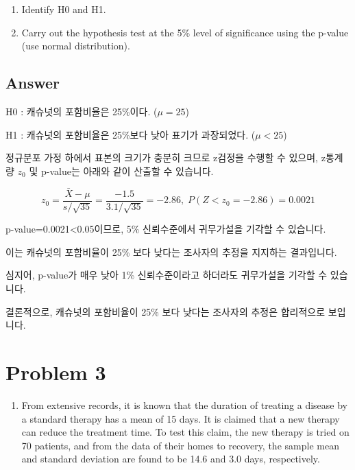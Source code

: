 \documentclass[
  a4paper,
  DIV=11,
  numbers=noendperiod]{scrreprt}
\providecommand{\tightlist}{%
  \setlength{\itemsep}{0pt}\setlength{\parskip}{0pt}}\usepackage{longtable,booktabs,array}
\begin{document}
\begin{enumerate}
\def\labelenumi{(\alph{enumi})}
\item
  Identify H0 and H1.
\item
  Carry out the hypothesis test at the 5\% level of significance using
  the p-value (use normal distribution).
\end{enumerate}

\subsection*{Answer}\label{answer-27}

H0 : 캐슈넛의 포함비율은 25\%이다. (\(\mu=25\))

H1 : 캐슈넛의 포함비율은 25\%보다 낮아 표기가 과장되었다. (\(\mu<25\))

정규분포 가정 하에서 표본의 크기가 충분히 크므로 z검정을 수행할 수
있으며, z통계량 \(z_0\) 및 p-value는 아래와 같이 산출할 수 있습니다.

\[z_0=\frac{\bar{X}-\mu}{s/\sqrt{35}}=\frac{-1.5}{3.1/\sqrt{35}}=-2.86,\;P(Z<z_0=-2.86)=0.0021\]

p-value=0.0021\textless0.05이므로, 5\% 신뢰수준에서 귀무가설을 기각할 수
있습니다.

이는 캐슈넛의 포함비율이 25\% 보다 낮다는 조사자의 추정을 지지하는
결과입니다.

심지어, p-value가 매우 낮아 1\% 신뢰수준이라고 하더라도 귀무가설을
기각할 수 있습니다.

결론적으로, 캐슈넛의 포함비율이 25\% 보다 낮다는 조사자의 추정은
합리적으로 보입니다.

\section*{Problem 3}\label{problem-3-2}


\begin{enumerate}
\def\labelenumi{\arabic{enumi}.}
\setcounter{enumi}{2}
\tightlist
\item
  From extensive records, it is known that the duration of treating a
  disease by a standard therapy has a mean of 15 days. It is claimed
  that a new therapy can reduce the treatment time. To test this claim,
  the new therapy is tried on 70 patients, and from the data of their
  homes to recovery, the sample mean and standard deviation are found to
  be 14.6 and 3.0 days, respectively.
\end{enumerate}
\end{document}
